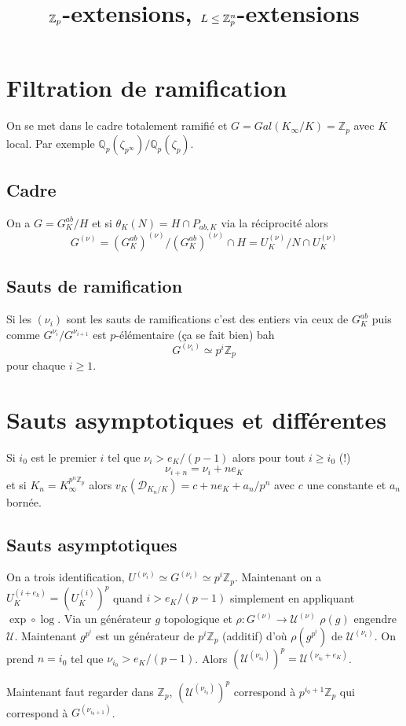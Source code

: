 \documentclass[a4paper,12pt]{book}
\title{$\Z_p$-extensions, $L\leq \Z_p^n$-extensions}
\date{}
\newcommand{\Z}{\mathbb{Z}}
\newcommand{\Q}{\mathbb{Q}}
\newcommand{\D}{\mathscr{D}}
\newcommand{\U}{\mathscr{U}}
\theoremstyle{plain}
\theoremstyle{definition}
\theoremstyle{remark}
\begin{document}
\maketitle
\section{Filtration de ramification}
On se met dans le cadre totalement ramifié et $G=Gal(K_\infty/K)=\Z_p$
avec $K$ local. Par exemple $\Q_p(\zeta_{p^\infty})/\Q_p(\zeta_p)$.
\subsection{Cadre}
On a $G=G_K^{ab}/H$ et si $\theta_K(N)=H\cap P_{ab,K}$ via la réciprocité
alors 
\[G^{(\nu)}=(G_K^{ab})^{(\nu)}/(G_K^{ab})^{(\nu)}\cap H=U_K^{(\nu)}/N\cap U_K^{(\nu)}\]
\subsection{Sauts de ramification}
Si les $(\nu_i)$ sont les sauts de ramifications 
c'est des entiers via ceux de $G_K^{ab}$ puis comme $G^{\nu_i}/G^{\nu_{i+1}}$
est $p$-élémentaire (ça se fait bien) bah
\[G^{(\nu_i)}\simeq p^i\Z_p\]
pour chaque $i\geq 1$.

\section{Sauts asymptotiques et différentes}
Si $i_0$ est le premier $i$ tel que $\nu_{i}>e_K/(p-1)$ alors
pour tout $i\geq i_0$ (!)
\[\nu_{i+n}=\nu_i+ne_K\]
et si $K_n=K_\infty^{p^n\Z_p}$ alors $v_K(\D_{K_n/K})=c+ne_K+a_n/p^n$
avec $c$ une constante et $a_n$ bornée. 
\subsection{Sauts asymptotiques}
On a trois identification, $U^{(\nu_i)}\simeq G^{(\nu_i)}\simeq p^i\Z_p$.
Maintenant on a $U_K^{(i+e_k)}=(U_K^{(i)})^p$ quand $i>e_K/(p-1)$ simplement
en appliquant $\exp\circ\log$. Via un générateur $g$ topologique
et $\rho\colon G^{(\nu)}\to \U^{(\nu)}$ $\rho(g)$ engendre $\U$.
Maintenant $g^{p^i}$ est un générateur de $p^i\Z_p$ (additif) d'où $\rho(g^{p^i})$ de
$\U^{(\nu_i)}$. On prend $n=i_0$ tel que $\nu_{i_0}>e_K/(p-1)$.
Alors $(\U^{(\nu_{i_0})})^p=\U^{(\nu_{i_0}+e_K)}$.

Maintenant faut regarder dans $\Z_p$, $(\U^{(\nu_{i_0})})^p$ correspond à
$p^{i_0+1}\Z_p$ qui correspond à $G^{(\nu_{i_0+1})}$.
\end{document}
